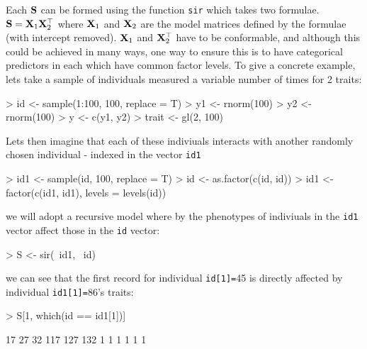 \documentclass{article}
\begin{document}
Each ${\bf S}$ can be formed using the function \texttt{sir} which takes two formulae. ${\bf S} = {\bf X}_{1}{\bf X}_{2}^{\top}$ where ${\bf X}_{1}$ and ${\bf X}_{2}$ are the model matrices defined by the formulae (with intercept removed).  ${\bf X}_{1}$ and ${\bf X}_{2}^{\top}$ have to be conformable, and although this could be achieved in many ways, one way to ensure this is to have categorical predictors in each which have common factor levels.  To give a concrete example, lets take a sample of individuals measured a variable number of times for 2 traits: 

\begin{Schunk}
\begin{Sinput}
> id <- sample(1:100, 100, replace = T)
> y1 <- rnorm(100)
> y2 <- rnorm(100)
> y <- c(y1, y2)
> trait <- gl(2, 100)
\end{Sinput}
\end{Schunk}


Lets then imagine that each of these indiviuals interacts with another randomly chosen individual - indexed in the vector \texttt{id1}

\begin{Schunk}
\begin{Sinput}
> id1 <- sample(id, 100, replace = T)
> id <- as.factor(c(id, id))
> id1 <- factor(c(id1, id1), levels = levels(id))
\end{Sinput}
\end{Schunk}

we will adopt a recursive model where by the phenotypes of indiviuals in the \texttt{id1} vector affect those in the \texttt{id} vector:

\begin{Schunk}
\begin{Sinput}
> S <- sir(~id1, ~id)
\end{Sinput}
\end{Schunk}

we can see that the first record for individual \texttt{id[1]=}45 is directly affected by individual \texttt{id1[1]=}86's traits:

\begin{Schunk}
\begin{Sinput}
> S[1, which(id == id1[1])]
\end{Sinput}
\begin{Soutput}
 17  27  32 117 127 132 
  1   1   1   1   1   1 
\end{Soutput}
\end{Schunk}
\end{document}
